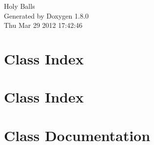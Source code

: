 \documentclass{book}
\begin{document}
\hypersetup{pageanchor=false,citecolor=blue}
\begin{titlepage}
\vspace*{7cm}
\begin{center}
{\Large Holy Balls }\\
\vspace*{1cm}
{\large Generated by Doxygen 1.8.0}\\
\vspace*{0.5cm}
{\small Thu Mar 29 2012 17:42:46}\\
\end{center}
\end{titlepage}
\clearemptydoublepage
{}
\tableofcontents
\clearemptydoublepage
{}
\hypersetup{pageanchor=true,citecolor=blue}
\chapter{Class Index}

\chapter{Class Index}

\chapter{Class Documentation}









































\printindex
\end{document}
